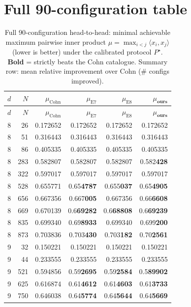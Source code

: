 \documentclass[10pt]{article}
\begin{document}
\section*{Full 90-configuration table}
{\footnotesize
\begin{longtable}{rrrrrr}
\caption{Full 90-configuration head-to-head: minimal achievable maximum pairwise inner product $\mu=\max_{i<j}\langle x_i,x_j\rangle$ (lower is better) under the calibrated protocol $P^\star$. \textbf{Bold} = strictly beats the Cohn catalogue. Summary row: mean relative improvement over Cohn (\# configs improved).}\\
\toprule
$d$ & $N$ & $\mu_{\mathrm{Cohn}}$ & $\mu_{\mathrm{E7}}$ & $\mu_{\mathrm{E8}}$ & $\mu_{\textbf{ours}}$ \\
\midrule \endfirsthead
\toprule $d$ & $N$ & $\mu_{\mathrm{Cohn}}$ & $\mu_{\mathrm{E7}}$ & $\mu_{\mathrm{E8}}$ & $\mu_{\textbf{ours}}$ \\ \midrule \endhead
8 & 26 & 0.172652 & 0.172652 & 0.172652 & 0.172652 \\
8 & 51 & 0.316443 & 0.316443 & 0.316443 & 0.316443 \\
8 & 86 & 0.405335 & 0.405335 & 0.405335 & 0.405335 \\
8 & 283 & 0.582807 & 0.582807 & 0.582807 & 0.582\textbf{428} \\
8 & 322 & 0.597017 & 0.597017 & 0.597017 & 0.597017 \\
8 & 528 & 0.655771 & 0.65\textbf{4787} & 0.655\textbf{037} & 0.65\textbf{4905} \\
8 & 656 & 0.667356 & 0.667\textbf{005} & 0.667356 & 0.66\textbf{6608} \\
8 & 669 & 0.670139 & 0.6\textbf{69282} & 0.6\textbf{68808} & 0.6\textbf{69239} \\
8 & 835 & 0.699340 & 0.69\textbf{8933} & 0.699340 & 0.699\textbf{200} \\
8 & 873 & 0.703836 & 0.703\textbf{430} & 0.703\textbf{182} & 0.70\textbf{2561} \\
9 & 32 & 0.150221 & 0.150221 & 0.150221 & 0.150221 \\
9 & 44 & 0.233555 & 0.233555 & 0.233555 & 0.233555 \\
9 & 521 & 0.594856 & 0.59\textbf{2695} & 0.59\textbf{2584} & 0.5\textbf{89902} \\
9 & 625 & 0.616874 & 0.61\textbf{4612} & 0.61\textbf{4603} & 0.61\textbf{3733} \\
9 & 750 & 0.646038 & 0.64\textbf{5774} & 0.64\textbf{5644} & 0.64\textbf{5669} \\

\end{longtable}}
\end{document}
